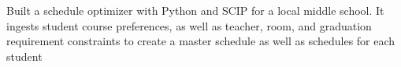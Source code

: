 \documentclass[]{plushcv}
\begin{document}
\begin{minipage}[t]{0.7\textwidth}
\begin{tightemize}
\item Built a schedule optimizer with Python and SCIP for a local middle school.
 It ingests student course preferences, as well as teacher, room, and graduation
  requirement constraints to create a master schedule as well as schedules for 
  each student \python\\

\end{tightemize}
\sectionsep



%
%

\end{minipage} 
\end{document}
